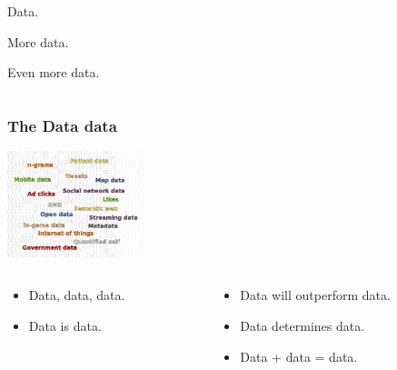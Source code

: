 \documentclass[11pt,xcolor=table]{beamer}
\begin{document}
\begin{frame}
\begin{center}
\begin{columns}
\begin{column}{0.5\textwidth}
Data.\\
\bigskip
\bigskip
\bigskip

More data.\\
\bigskip
\bigskip
\bigskip

Even more data.
\end{column}

\end{columns}

\end{center}

\end{frame}


\begin{frame}
\frametitle{The Data data}

\begin{center}
\includegraphics[width=0.3\textwidth]{graphics/data_cloud2.pdf}

\begin{columns}

\begin{column}{0.5\textwidth}
\begin{center}
\begin{itemize}
\item Data, data, data.
\item Data is data.
\end{itemize}
\end{center}
\end{column}

\begin{column}{0.5\textwidth}
\begin{itemize}
\item Data will outperform data.
\item Data determines data.
\item Data + data = data.
\end{itemize}
\end{column}

\end{columns}

\end{center}

\end{frame}
\end{document}
